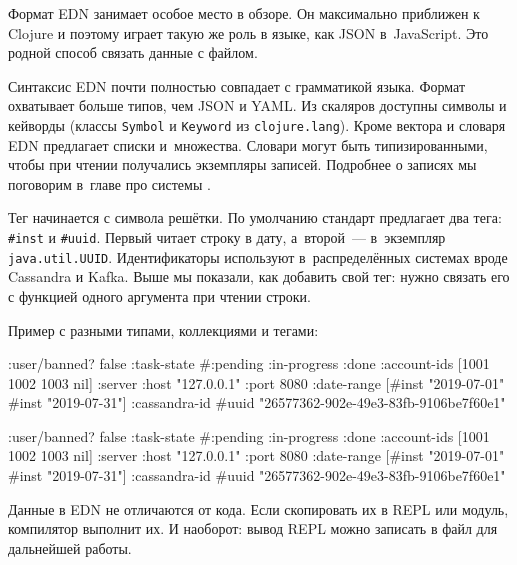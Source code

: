 
Формат EDN занимает особое место в обзоре. Он максимально приближен к Clojure и
поэтому играет такую же роль в языке, как JSON в~JavaScript. Это родной способ
связать данные с файлом.

Синтаксис EDN почти полностью совпадает с грамматикой языка. Формат охватывает
больше типов, чем JSON и YAML. Из скаляров доступны символы и кейворды (классы
\verb|Symbol| и \verb|Keyword| из \verb|clojure.lang|). Кроме вектора и словаря
EDN предлагает списки и~множества. Словари могут быть типизированными, чтобы при
чтении получались экземпляры записей. Подробнее о записях мы поговорим в~главе
про системы .


Тег начинается с символа решётки. По умолчанию стандарт предлагает два тега:
\verb|#inst| и \verb|#uuid|. Первый читает строку в дату, а~второй~---
в~экземпляр \verb|java.util.UUID|. Идентификаторы используют в~распределённых
системах вроде Cassandra и Kafka. Выше мы показали, как добавить свой тег: нужно
связать его с функцией одного аргумента при чтении строки.

Пример с разными типами, коллекциями и тегами:

\ifx\devicetype\mobile

\begin{english}
  \begin{clojure}
{:user/banned? false
 :task-state
 #{:pending :in-progress :done}
 :account-ids
 [1001 1002 1003 nil]
 :server
 {:host "127.0.0.1" :port 8080}
 :date-range
 [#inst "2019-07-01" #inst "2019-07-31"]
 :cassandra-id #uuid
 "26577362-902e-49e3-83fb-9106be7f60e1"}
  \end{clojure}
\end{english}

\else

\begin{english}
  \begin{clojure}
{:user/banned? false
 :task-state #{:pending :in-progress :done}
 :account-ids [1001 1002 1003 nil]
 :server {:host "127.0.0.1" :port 8080}
 :date-range [#inst "2019-07-01" #inst "2019-07-31"]
 :cassandra-id #uuid "26577362-902e-49e3-83fb-9106be7f60e1"}
  \end{clojure}
\end{english}

\fi

Данные в EDN не отличаются от кода. Если скопировать их в REPL или модуль,
компилятор выполнит их. И наоборот: вывод REPL можно записать в файл для
дальнейшей работы.

